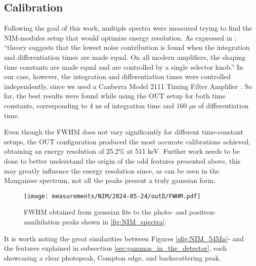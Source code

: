 
\subsection{Calibration}

Following the goal of this work, multiple spectra were measured trying to find the NIM-modules setup that would optimize energy resolution. As expressed in \cite[sec.~4.4.3]{gilmore2008practical}: ``theory suggests that the lowest noise contribution is found when the integration and differentiation times are made equal. On all modern amplifiers, the shaping time constants are made equal and are controlled by a single selector knob.'' In our case, however, the integration and differentiation times were controlled independently, since we used a Canberra Model 2111 Timing Filter Amplifier \cite{CanberraTFA}. So far, the best results were found while using the OUT setup for both time constants, corresponding to 4 ns of integration time and 160 $\mu$s of differentiation time. 

Even though the FWHM does not vary significantly for different time-constant setups, the OUT configuration produced the most accurate calibrations achieved, obtaining an energy resolution of 25.2\% at 511 keV. Further work needs to be done to better understand the origin of the odd features presented above, this may greatly influence the energy resolution since, as can be seen in the Manganese spectrum, not all the peaks present a truly gaussian form.

\begin{figure}[H]
  \centering
  \texttt{[image: measurements/NIM/2024-05-24/outD/FWHM.pdf]}
  \caption{\label{fig:NIM_FWHM}FWHM obtained from gaussian fits to the photo- and positron-annihilation peaks shown in \ref{fig:NIM_spectra}.}
\end{figure}

It is worth noting the great similarities between Figures \ref{sfig:NIM_54Mn}- and the features explained in subsection \ref{sec:gammas_in_the_detector}, each showcasing a clear photopeak, Compton edge, and backscattering peak.

